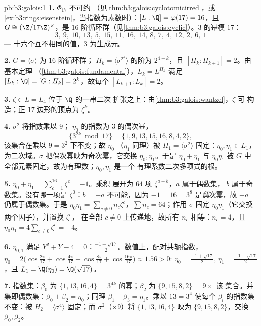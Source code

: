 \begin{solution}{pb:b3:galois:1}
\textbf{1.} $\Phi_{17}$ 不可约
（见\cref{thm:b3:galois:cyclotomicirred}，或
\cref{ex:b3:rings:eisenstein}，当指数为素数时）：$[L:\Q] =
\varphi(17) = 16$，且 $G \cong (\Z/17\Z)^\times$，是
$16$ 阶循环群（见\cref{thm:b3:galois:cyclic}）。$3$ 的幂模
$17$：
\[
3,\ 9,\ 10,\ 13,\ 5,\ 15,\ 11,\ 16,\ 14,\ 8,\ 7,\ 4,\ 12,\ 2,\
6,\ 1
\]
--- 十六个互不相同的值，$3$ 为生成元。

\textbf{2.} $G = \langle\sigma\rangle$ 为 $16$ 阶循环群；
$H_k = \langle\sigma^{2^k}\rangle$ 的阶为 $2^{4-k}$，且
$[H_k : H_{k+1}] = 2$。由基本定理
（\cref{thm:b3:galois:fundamental}），$L_k = L^{H_k}$ 满足
$[L_k : \Q] = [G : H_k] = 2^k$，故每个 $[L_{k+1}:L_k] = 2$。

\textbf{3.} $\zeta \in L = L_4$ 位于 $\Q$ 的一串二次
扩张之上：由\cref{thm:b3:galois:wantzel}，$\zeta$ 可
构造；正 $17$ 边形的顶点为 $\zeta^k$。

\textbf{4.} $\sigma^2$ 将指数乘以 $9$；
$\eta_0$ 的指数为 $3$ 的偶次幂，
\[
\{3^{2k} \bmod 17\} = \{1, 9, 13, 15, 16, 8, 4, 2\},
\]
该集合在乘以 $9 = 3^2$ 下不变；故 $\eta_0$
（$\eta_1$ 同理）被 $H_1 =
\langle\sigma^2\rangle$ 固定：$\eta_0, \eta_1 \in L_1$，
为二次域。$\sigma$ 把偶次幂映为奇次幂，它交换 $\eta_0,
\eta_1$。于是 $\eta_0 + \eta_1$ 与 $\eta_0\eta_1$ 被
$G$ 中全部元素固定，故为有理数；$\eta_0, \eta_1$ 是一个
有理系数二次多项式的根。

\textbf{5.} $\eta_0 + \eta_1 = \sum_{c=1}^{16}\zeta^c = -1$。乘积
展开为 $64$ 项 $\zeta^{a + b}$，$a$ 属于偶数集，
$b$ 属于奇数集。没有哪一项是 $\zeta^0$：$b = -a$
不可能，因为 $-1 = 16 = 3^8$ 是\emph{偶}次幂，故
$-a$ 仍属于偶数集。于是 $\eta_0\eta_1 = \sum_{c \neq 0}
n_c\zeta^c$，$\sum n_c = 64$；作用 $\sigma$ 固定
$\eta_0\eta_1$（它交换两个因子），并置换 $\zeta^c$，
在全部 $c \neq 0$ 上传递地，故所有 $n_c$ 相等：$n_c
= 4$，且 $\eta_0\eta_1 = 4\sum_{c\neq0}\zeta^c = -4$。

\textbf{6.} $\eta_{0,1}$ 满足 $Y^2 + Y - 4 = 0$：$\frac{-1 \pm
\sqrt{17}}2$。数值上，配对共轭指数，
$\eta_0 = 2\bigl(\cos\tfrac{2\pi}{17} + \cos\tfrac{4\pi}{17} +
\cos\tfrac{8\pi}{17} + \cos\tfrac{16\pi}{17}\bigr) \approx 1.56
> 0$: $\eta_0 = \frac{-1+\sqrt{17}}2$, $\eta_1 =
\frac{-1-\sqrt{17}}2$，且 $L_1 = \Q(\eta_0) = \Q(\sqrt{17})$。

\textbf{7.} 指数集：$\beta_0$ 为 $\{1, 13, 16, 4\}$ =
$3^{4k}$ 的幂；$\beta_2$ 为 $\{9, 15, 8, 2\}$ = $9 \times$ 该
集合。并集即偶数集：$\beta_0 + \beta_2 = \eta_0$；同理
$\beta_1 + \beta_3 = \eta_1$。乘以 $13 = 3^4$
使每个 $\beta_i$ 的指数集不变：被 $H_2 =
\langle\sigma^4\rangle$ 固定；而 $\sigma^2$（$\times 9$）将
$\{1,13,16,4\}$ 映为 $\{9, 15, 8, 2\}$，交换 $\beta_0,
\beta_2$。


\end{solution}
